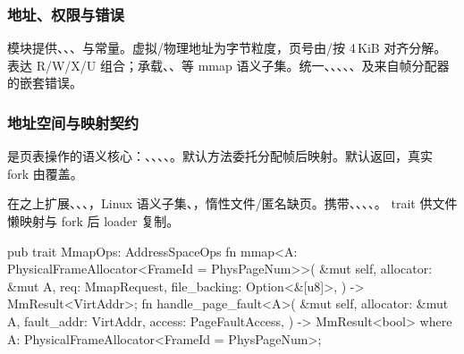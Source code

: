
\subsubsection{地址、权限与错误}

模块提供、、、与常量。虚拟/物理地址为字节粒度，页号由/按 4\,KiB 对齐分解。表达 R/W/X/U 组合；承载、、等 mmap 语义子集。统一、、、、、及来自帧分配器的嵌套错误。

\subsubsection{地址空间与映射契约}

是页表操作的语义核心：、、、、。默认方法委托分配帧后映射。默认返回，真实 fork 由覆盖。

在之上扩展、、、，Linux 语义子集、，惰性文件/匿名缺页。携带、、、、。 trait 供文件懒映射与 fork 后 loader 复制。

\begin{rustcode}
pub trait MmapOps: AddressSpaceOps {
    fn mmap<A: PhysicalFrameAllocator<FrameId = PhysPageNum>>(
        &mut self, allocator: &mut A, req: MmapRequest,
        file_backing: Option<&[u8]>,
    ) -> MmResult<VirtAddr>;
    fn handle_page_fault<A>(
        &mut self, allocator: &mut A,
        fault_addr: VirtAddr, access: PageFaultAccess,
    ) -> MmResult<bool>
    where A: PhysicalFrameAllocator<FrameId = PhysPageNum>;
}
\end{rustcode}

